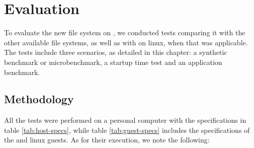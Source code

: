 \chapter{Evaluation}

To evaluate the new file system on \osv{}, we conducted tests comparing it
with the other available file systems, as well as with \viofs{} on linux,
when that was applicable. The tests include three scenarios, as detailed in
this chapter: a synthetic benchmark or microbenchmark, a startup time test and
an application benchmark.

\section{Methodology}

All the tests were performed on a personal computer with the specifications in
table \ref{tab:host-specs}, while table \ref{tab:guest-specs} includes the
specifications of the \osv{} and linux guests. As for their execution, we
note the following:
